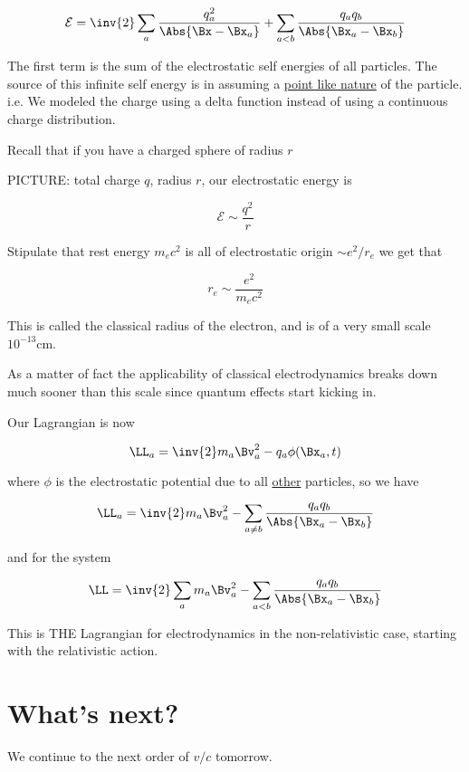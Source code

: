 \begin{equation}\label{eqn:relativisticElectrodynamicsL24:310}
\mathcal{E} = \inv{2} \sum_a \frac{q_a^2}{\Abs{\Bx - \Bx_a}} + \sum_{a < b} \frac{q_a q_b}{\Abs{\Bx_a - \Bx_b}}
\end{equation}

The first term is the sum of the electrostatic self energies of all particles.  The source of this infinite self energy is in assuming a \underline{point like nature} of the particle.  i.e.  We modeled the charge using a delta function instead of using a continuous charge distribution.

Recall that if you have a charged sphere of radius $r$

PICTURE: total charge $q$, radius $r$, our electrostatic energy is 

\begin{equation}\label{eqn:relativisticElectrodynamicsL24:330}
\mathcal{E} \sim \frac{q^2}{r}
\end{equation}

Stipulate that rest energy $m_e c^2$ is all of electrostatic origin $\sim e^2/r_e$ we get that 

\begin{equation}\label{eqn:relativisticElectrodynamicsL24:350}
r_e \sim \frac{e^2}{m_e c^2}
\end{equation}

This is called the classical radius of the electron, and is of a very small scale $10^{-13} \text{cm}$.

As a matter of fact the applicability of classical electrodynamics breaks down much sooner than this scale since quantum effects start kicking in.

Our Lagrangian is now

\begin{equation}\label{eqn:relativisticElectrodynamicsL24:370}
\LL_a = \inv{2} m_a \Bv_a^2 - q_a \phi(\Bx_a, t)
\end{equation}

where $\phi$ is the electrostatic potential due to all \underline{other} particles, so we have

\begin{equation}\label{eqn:relativisticElectrodynamicsL24:390}
\LL_a = \inv{2} m_a \Bv_a^2 - \sum_{a \ne b} \frac{q_a q_b }{\Abs{\Bx_a - \Bx_b}}
\end{equation}

and for the system

\begin{equation}\label{eqn:relativisticElectrodynamicsL24:410}
\LL = \inv{2} \sum_a m_a \Bv_a^2 - \sum_{a < b} \frac{q_a q_b }{\Abs{\Bx_a - \Bx_b}}
\end{equation}

This is THE Lagrangian for electrodynamics in the non-relativistic case, starting with the relativistic action.

\section{What's next?}

We continue to the next order of $v/c$ tomorrow.

\EndArticle
